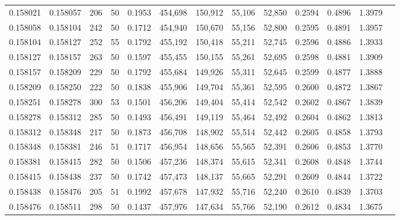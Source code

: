 \begin{tabular}{rrrrrrrrrrrrr}
0.158021 & 0.158057 &   206 &  50 &                                     0.1953 & 454,698 & 150,912 &  55,106 &  52,850 & 0.2594 & 0.4896 & 1.3979 \\
0.158058 & 0.158104 &   242 &  50 &                                     0.1712 & 454,940 & 150,670 &  55,156 &  52,800 & 0.2595 & 0.4891 & 1.3957 \\
0.158104 & 0.158127 &   252 &  55 &                                     0.1792 & 455,192 & 150,418 &  55,211 &  52,745 & 0.2596 & 0.4886 & 1.3933 \\
0.158127 & 0.158157 &   263 &  50 &                                     0.1597 & 455,455 & 150,155 &  55,261 &  52,695 & 0.2598 & 0.4881 & 1.3909 \\
0.158157 & 0.158209 &   229 &  50 &                                     0.1792 & 455,684 & 149,926 &  55,311 &  52,645 & 0.2599 & 0.4877 & 1.3888 \\
0.158209 & 0.158250 &   222 &  50 &                                     0.1838 & 455,906 & 149,704 &  55,361 &  52,595 & 0.2600 & 0.4872 & 1.3867 \\
0.158251 & 0.158278 &   300 &  53 &                                     0.1501 & 456,206 & 149,404 &  55,414 &  52,542 & 0.2602 & 0.4867 & 1.3839 \\
0.158278 & 0.158312 &   285 &  50 &                                     0.1493 & 456,491 & 149,119 &  55,464 &  52,492 & 0.2604 & 0.4862 & 1.3813 \\
0.158312 & 0.158348 &   217 &  50 &                                     0.1873 & 456,708 & 148,902 &  55,514 &  52,442 & 0.2605 & 0.4858 & 1.3793 \\
0.158348 & 0.158381 &   246 &  51 &                                     0.1717 & 456,954 & 148,656 &  55,565 &  52,391 & 0.2606 & 0.4853 & 1.3770 \\
0.158381 & 0.158415 &   282 &  50 &                                     0.1506 & 457,236 & 148,374 &  55,615 &  52,341 & 0.2608 & 0.4848 & 1.3744 \\
0.158415 & 0.158438 &   237 &  50 &                                     0.1742 & 457,473 & 148,137 &  55,665 &  52,291 & 0.2609 & 0.4844 & 1.3722 \\
0.158438 & 0.158476 &   205 &  51 &                                     0.1992 & 457,678 & 147,932 &  55,716 &  52,240 & 0.2610 & 0.4839 & 1.3703 \\
0.158476 & 0.158511 &   298 &  50 &                                     0.1437 & 457,976 & 147,634 &  55,766 &  52,190 & 0.2612 & 0.4834 & 1.3675 \\

\end{tabular}
